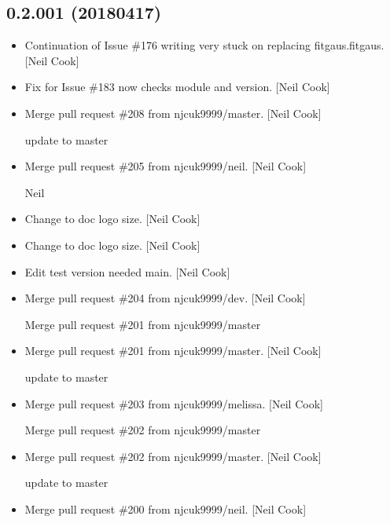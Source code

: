 \documentclass[a4paper,10pt,english]{report}
\begin{document}
\subsection{0.2.001 (2018\sphinxhyphen{}04\sphinxhyphen{}17)}
\label{\detokenize{misc/changelog:id479}}\begin{itemize}
\item {} 
Continuation of Issue \#176 \sphinxhyphen{} writing  \sphinxhyphen{} very stuck on replacing
fitgaus.fitgaus. {[}Neil Cook{]}

\item {} 
Fix for Issue \#183 \sphinxhyphen{} now checks module and version. {[}Neil Cook{]}

\item {} 
Merge pull request \#208 from njcuk9999/master. {[}Neil Cook{]}

update to master

\item {} 
Merge pull request \#205 from njcuk9999/neil. {[}Neil Cook{]}

Neil

\item {} 
Change to doc logo size. {[}Neil Cook{]}

\item {} 
Change to doc logo size. {[}Neil Cook{]}

\item {} 
Edit \sphinxhyphen{} test version needed main. {[}Neil Cook{]}

\item {} 
Merge pull request \#204 from njcuk9999/dev. {[}Neil Cook{]}

Merge pull request \#201 from njcuk9999/master

\item {} 
Merge pull request \#201 from njcuk9999/master. {[}Neil Cook{]}

update to master

\item {} 
Merge pull request \#203 from njcuk9999/melissa. {[}Neil Cook{]}

Merge pull request \#202 from njcuk9999/master

\item {} 
Merge pull request \#202 from njcuk9999/master. {[}Neil Cook{]}

update to master

\item {} 
Merge pull request \#200 from njcuk9999/neil. {[}Neil Cook{]}


\end{itemize}
\end{document}
